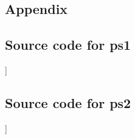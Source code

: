 \documentclass[a4paper,12pt]{article}
\begin{document}
\begin{flushleft}
\section{\large{Appendix}} 
\subsection{Source code for ps1}
]
\subsection{Source code for ps2}
]



\newpage


\end{flushleft}
\end{document}
